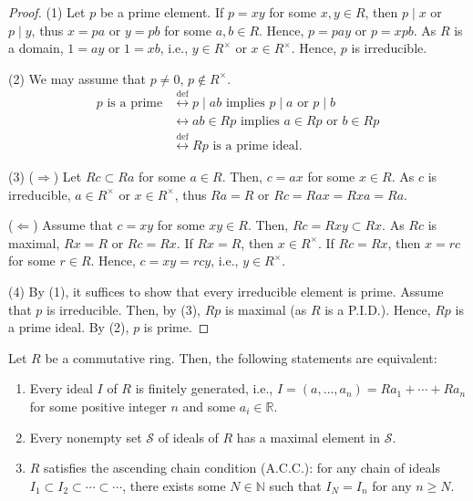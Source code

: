 \documentclass[twoside]{article}
\newcommand\N{\mathbb N}
\newcommand\R{\mathbb R}
\theoremstyle{remark}
\begin{document}
\begin{proof}
  (1) Let \(p\) be a prime element. If \(p = xy\) for some \(x,y \in R\), then \(p \mid x\) or \(p \mid y\), thus \(x = pa\) or \(y = pb\) for some \(a,b \in R\). Hence, \(p = pay\) or \(p = xpb\). As \(R\) is a domain, \(1 = ay\) or \(1 = xb\), i.e., \(y \in R^\times\) or \(x \in R^\times\). Hence, \(p\) is irreducible. \par
  (2) We may assume that \(p \neq 0\), \(p \notin R^\times\).
  \begin{align*}
    \text{\(p\) is a prime} & \stackrel{\mathrm{def}}{\leftrightarrow} \text{\(p \mid ab\) implies \(p \mid a\) or \(p \mid b\)} \\
    & \leftrightarrow \text{\(ab \in Rp\) implies \(a \in Rp\) or \(b \in Rp\)} \\
    & \stackrel{\mathrm{def}}{\leftrightarrow} \text{\(Rp\) is a prime ideal}.
  \end{align*} \par
  (3) (\(\Rightarrow\)) Let \(Rc \subset Ra\) for some \(a \in R\). Then, \(c = ax\) for some \(x \in R\). As \(c\) is irreducible, \(a \in R^\times\) or \(x \in R^\times\), thus \(Ra = R\) or \(Rc = Rax = Rxa = Ra\). \par
  (\(\Leftarrow\)) Assume that \(c = xy\) for some \(xy \in R\). Then, \(Rc = Rxy \subset Rx\). As \(Rc\) is maximal, \(Rx = R\) or \(Rc = Rx\). If \(Rx = R\), then \(x \in R^\times\). If \(Rc = Rx\), then \(x = rc\) for some \(r \in R\). Hence, \(c = xy = rcy\), i.e., \(y \in R^\times\). \par
  (4) By (1), it suffices to show that every irreducible element is prime. Assume that \(p\) is irreducible. Then, by (3), \(Rp\) is maximal (as \(R\) is a P.I.D.). Hence, \(Rp\) is a prime ideal. By (2), \(p\) is prime.
\end{proof}

\begin{lemma}
  Let \(R\) be a commutative ring. Then, the following statements are equivalent:
  \begin{enumerate}[label=\textup{(\arabic*)}, nosep]
    \item Every ideal \(I\) of \(R\) is finitely generated, i.e., \(I = (a, \dots, a_n) = Ra_1 + \cdots + Ra_n\) for some positive integer \(n\) and some \(a_i \in \R\).
    \item Every nonempty set \(\mathcal S\) of ideals of \(R\) has a maximal element in \(\mathcal S\).
    \item \(R\) satisfies the ascending chain condition (A.C.C.): for any chain of ideals \(I_1 \subset I_2 \subset \cdots \subset\cdots\), there exists some \(N \in \N\) such that \(I_N = I_n\) for any \(n \geq N\).
  \end{enumerate}
\end{lemma}
\end{document}
